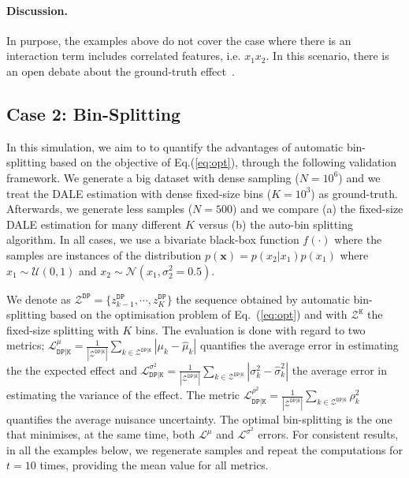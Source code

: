 \documentclass[twoside]{article}
\begin{document}
\paragraph{Discussion.}

In purpose, the examples above do not cover the case where there is an
interaction term includes correlated features, i.e. \(x_1x_2\). In
this scenario, there is an open debate about the ground-truth
effect~\citep{Gromping2020MAEP}.

\subsection{Case 2: Bin-Splitting}
\label{sec:simulation-examples-2}

In this simulation, we aim to to quantify the advantages of automatic
bin-splitting based on the objective of Eq.(\ref{eq:opt}), through the
following validation framework. We generate a big dataset with dense
sampling (\(N=10^6\)) and we treat the DALE estimation with dense
fixed-size bins (\(K=10^3\)) as ground-truth. Afterwards, we generate
less samples (\(N=500\)) and we compare (a) the fixed-size DALE
estimation for many different \(K\) versus (b) the auto-bin splitting
algorithm. In all cases, we use a bivariate black-box function
\(f(\cdot)\) where the samples are instances of the distribution
\(p(\mathbf{x}) = p(x_2|x_1)p(x_1)\) where
\(x_1 \sim \mathcal{U}(0,1)\) and
\(x_2 \sim \mathcal{N}(x_1, \sigma_2^2=0.5)\).

We denote as
\(\mathcal{Z^{\mathtt{DP}}} = \{z^{\mathtt{DP}}_{k-1}, \cdots,
z^{\mathtt{DP}}_{K}\}\) the sequence obtained by automatic
bin-splitting based on the optimisation problem of Eq.~(\ref{eq:opt})
and with \(\mathcal{Z^{\mathtt{K}}}\) the fixed-size splitting with
\(K\) bins. The evaluation is done with regard to two metrics;
\(\mathcal{L}_{\mathtt{DP|K}}^{\mu} =
\frac{1}{|\mathcal{Z}^{\mathtt{DP|K}}|} \sum_{k \in
  \mathcal{Z}^{\mathtt{DP|K}}} | \mu_k - \hat{\mu}_k | \) quantifies
the average error in estimating the the expected effect and
\(\mathcal{L}_{\mathtt{DP|K}}^{\sigma^2} =
\frac{1}{|\mathcal{Z}^{\mathtt{DP|K}}|} \sum_{k \in
  \mathcal{Z}^{\mathtt{DP|K}}} | \sigma_k^2 - \hat{\sigma}^2_k | \)
the average error in estimating the variance of the effect. The metric
\(\mathcal{L}^{\rho^2}_{\mathtt{DP|K}} =
\frac{1}{|\mathcal{Z}^{\mathtt{DP|K}}|} \sum_{k \in
  \mathcal{Z}^{\mathtt{DP|K}}} \rho^2_k \) quantifies the average
nuisance uncertainty. The optimal bin-splitting is the one that
minimises, at the same time, both \(\mathcal{L}^{\mu}\) and
\(\mathcal{L}^{\sigma^2}\) errors. For consistent results, in all the
examples below, we regenerate samples and repeat the computations for
\(t = 10\) times, providing the mean value for all metrics.
\end{document}
